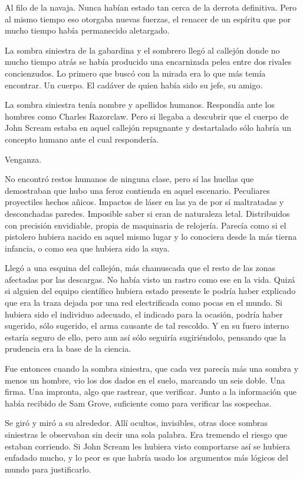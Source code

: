 Al filo de la navaja. Nunca habían estado tan cerca de la derrota definitiva. Pero al mismo tiempo eso otorgaba nuevas fuerzas, el renacer de un espíritu que por mucho tiempo había permanecido aletargado.

\fancyparbreak
La sombra siniestra de la gabardina y el sombrero llegó al callejón donde no mucho tiempo atrás se había producido una encarnizada pelea entre dos rivales concienzudos. Lo primero que buscó con la mirada era lo que más temía encontrar. Un cuerpo. El cadáver de quien había sido su jefe, su amigo.

La sombra siniestra tenía nombre y apellidos humanos. Respondía ante los hombres como Charles Razorclaw. Pero si llegaba a descubrir que el cuerpo de John Scream estaba en aquel callejón repugnante y destartalado sólo habría un concepto humano ante el cual respondería.

Venganza.

No encontró restos humanos de ninguna clase, pero sí las huellas que demostraban que hubo una feroz contienda en aquel escenario. Peculiares proyectiles hechos añicos. Impactos de láser en las ya de por sí maltratadas y desconchadas paredes. Imposible saber si eran de naturaleza letal. Distribuidos con precisión envidiable, propia de maquinaria de relojería. Parecía como si el pistolero hubiera nacido en aquel mismo lugar y lo conociera desde la más tierna infancia, o como sea que hubiera sido la suya.

Llegó a una esquina del callejón, más chamuscada que el resto de las zonas afectadas por las descargas. No había visto un rastro como ese en la vida. Quizá si alguien del equipo científico hubiera estado presente le podría haber explicado que era la traza dejada por una red electrificada como pocas en el mundo. Si hubiera sido el individuo adecuado, el indicado para la ocasión, podría haber sugerido, sólo sugerido, el arma causante de tal rescoldo. Y en su fuero interno estaría seguro de ello, pero aun así sólo seguiría sugiriéndolo, pensando que la prudencia era la base de la ciencia.

Fue entonces cuando la sombra siniestra, que cada vez parecía más una sombra y menos un hombre, vio los dos dados en el suelo, marcando un seis doble. Una firma. Una impronta, algo que rastrear, que verificar. Junto a la información que había recibido de Sam Grove, suficiente como para verificar las sospechas.

Se giró y miró a su alrededor. Allí ocultos, invisibles, otras doce sombras siniestras le observaban sin decir una sola palabra. Era tremendo el riesgo que estaban corriendo. Si John Scream les hubiera visto comportarse así se hubiera enfadado mucho, y lo peor es que habría usado los argumentos más lógicos del mundo para justificarlo.

